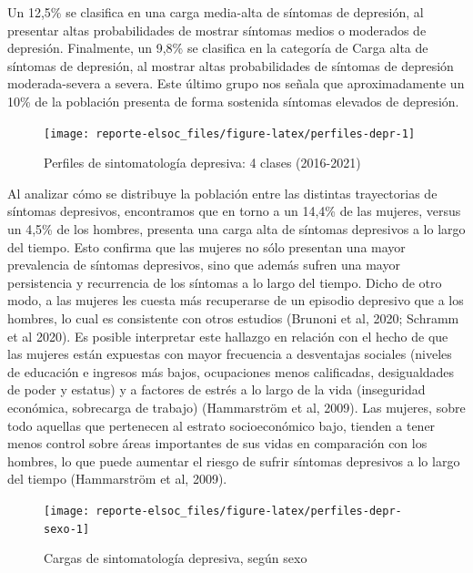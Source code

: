 \documentclass[
  12pt,
]{book}
\begin{document}
Un 12,5\% se clasifica en una carga media-alta de síntomas de depresión, al presentar altas probabilidades de mostrar síntomas medios o moderados de depresión. Finalmente, un 9,8\% se clasifica en la categoría de Carga alta de síntomas de depresión, al mostrar altas probabilidades de síntomas de depresión moderada-severa a severa. Este último grupo nos señala que aproximadamente un 10\% de la población presenta de forma sostenida síntomas elevados de depresión.

\begin{figure}

{\centering \texttt{[image: reporte-elsoc\_files/figure-latex/perfiles-depr-1]} 

}

\caption{Perfiles de sintomatología depresiva: 4 clases (2016-2021)}\label{fig:perfiles-depr}
\end{figure}

Al analizar cómo se distribuye la población entre las distintas trayectorias de síntomas depresivos, encontramos que en torno a un 14,4\% de las mujeres, versus un 4,5\% de los hombres, presenta una carga alta de síntomas depresivos a lo largo del tiempo. Esto confirma que las mujeres no sólo presentan una mayor prevalencia de síntomas depresivos, sino que además sufren una mayor persistencia y recurrencia de los síntomas a lo largo del tiempo. Dicho de otro modo, a las mujeres les cuesta más recuperarse de un episodio depresivo que a los hombres, lo cual es consistente con otros estudios (Brunoni et al, 2020; Schramm et al 2020). Es posible interpretar este hallazgo en relación con el hecho de que las mujeres están expuestas con mayor frecuencia a desventajas sociales (niveles de educación e ingresos más bajos, ocupaciones menos calificadas, desigualdades de poder y estatus) y a factores de estrés a lo largo de la vida (inseguridad económica, sobrecarga de trabajo) (Hammarström et al, 2009). Las mujeres, sobre todo aquellas que pertenecen al estrato socioeconómico bajo, tienden a tener menos control sobre áreas importantes de sus vidas en comparación con los hombres, lo que puede aumentar el riesgo de sufrir síntomas depresivos a lo largo del tiempo (Hammarström et al, 2009).

\begin{figure}

{\centering \texttt{[image: reporte-elsoc\_files/figure-latex/perfiles-depr-sexo-1]} 

}

\caption{Cargas de sintomatología depresiva, según sexo}\label{fig:perfiles-depr-sexo}
\end{figure}
\end{document}
